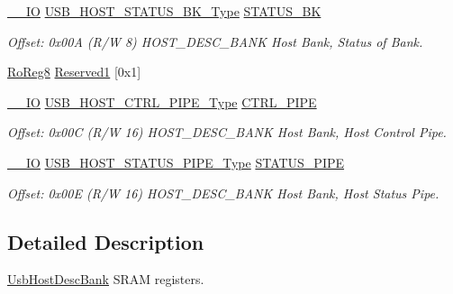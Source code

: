 \begin{DoxyCompactItemize}
\mbox{\hyperlink{core__cm0plus_8h_aec43007d9998a0a0e01faede4133d6be}{\+\_\+\+\_\+\+IO}} \mbox{\hyperlink{union_u_s_b___h_o_s_t___s_t_a_t_u_s___b_k___type}{U\+S\+B\+\_\+\+H\+O\+S\+T\+\_\+\+S\+T\+A\+T\+U\+S\+\_\+\+B\+K\+\_\+\+Type}} \mbox{\hyperlink{struct_usb_host_desc_bank_a0798901e51bb9674eee7a6d22876f75e}{S\+T\+A\+T\+U\+S\+\_\+\+BK}}
\begin{DoxyCompactList}\small\item\em Offset\+: 0x00A (R/W 8) H\+O\+S\+T\+\_\+\+D\+E\+S\+C\+\_\+\+B\+A\+NK Host Bank, Status of Bank. \end{DoxyCompactList}\item 
\mbox{\hyperlink{group___s_a_m_d21_e15_a__definitions_ga0d957f1433aaf5d70e4dc2b68288442d}{Ro\+Reg8}} \mbox{\hyperlink{struct_usb_host_desc_bank_a092866123ac46d0985136e4dca2f36f4}{Reserved1}} \mbox{[}0x1\mbox{]}
\item 
\mbox{\hyperlink{core__cm0plus_8h_aec43007d9998a0a0e01faede4133d6be}{\+\_\+\+\_\+\+IO}} \mbox{\hyperlink{union_u_s_b___h_o_s_t___c_t_r_l___p_i_p_e___type}{U\+S\+B\+\_\+\+H\+O\+S\+T\+\_\+\+C\+T\+R\+L\+\_\+\+P\+I\+P\+E\+\_\+\+Type}} \mbox{\hyperlink{struct_usb_host_desc_bank_a3a056d7eb5f8f72be939feabd1d97b1c}{C\+T\+R\+L\+\_\+\+P\+I\+PE}}
\begin{DoxyCompactList}\small\item\em Offset\+: 0x00C (R/W 16) H\+O\+S\+T\+\_\+\+D\+E\+S\+C\+\_\+\+B\+A\+NK Host Bank, Host Control Pipe. \end{DoxyCompactList}\item 
\mbox{\hyperlink{core__cm0plus_8h_aec43007d9998a0a0e01faede4133d6be}{\+\_\+\+\_\+\+IO}} \mbox{\hyperlink{union_u_s_b___h_o_s_t___s_t_a_t_u_s___p_i_p_e___type}{U\+S\+B\+\_\+\+H\+O\+S\+T\+\_\+\+S\+T\+A\+T\+U\+S\+\_\+\+P\+I\+P\+E\+\_\+\+Type}} \mbox{\hyperlink{struct_usb_host_desc_bank_a38973efc056bd1ab77a7a860ba49dfe9}{S\+T\+A\+T\+U\+S\+\_\+\+P\+I\+PE}}
\begin{DoxyCompactList}\small\item\em Offset\+: 0x00E (R/W 16) H\+O\+S\+T\+\_\+\+D\+E\+S\+C\+\_\+\+B\+A\+NK Host Bank, Host Status Pipe. \end{DoxyCompactList}\end{DoxyCompactItemize}


\subsection{Detailed Description}
\mbox{\hyperlink{struct_usb_host_desc_bank}{Usb\+Host\+Desc\+Bank}} S\+R\+AM registers. 

